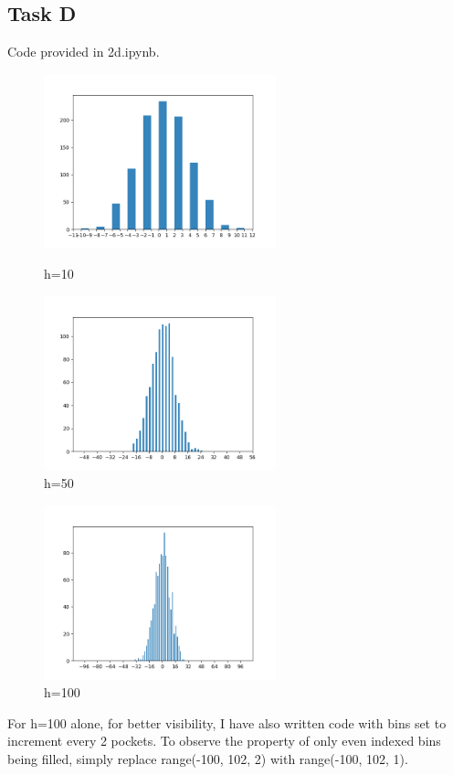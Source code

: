 \subsection{Task D}
Code provided in 2d.ipynb.
\begin{figure}[H]
    \centering
    \includegraphics[width=0.6\textwidth]{../images/2d1.png}
\end{figure}
    \begin{figure}[H]
        \centering
        \caption{h=10}
    \includegraphics[width=0.6\textwidth]{../images/2d2.png}
    \caption{h=50}
\end{figure}
    \begin{figure}[H]
        \centering
        \includegraphics[width=0.6\textwidth]{../images/2d3.png}
    \caption{h=100}
\end{figure}
For h=100 alone, for better visibility, I have also written code with bins set to increment every 2 pockets. To observe the property of only even indexed bins being filled, simply replace range(-100, 102, 2) with range(-100, 102, 1).

